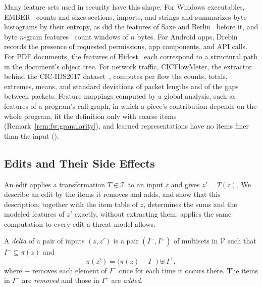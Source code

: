 Many feature sets used in security have this shape. For Windows executables, EMBER~\cite{anderson2018ember} counts
and sizes sections, imports, and strings and summarizes byte histograms by their entropy, as did the features of Saxe
and Berlin~\cite{saxe2015deep} before it, and byte $n$-gram features~\cite{kolter2004learning} count windows of $n$
bytes. For Android apps, Drebin~\cite{arp2014drebin} records the presence of requested permissions, app components,
and API calls. For PDF documents, the features of Hidost~\cite{srndic2016hidost} each correspond to a structural
path in the document's object tree. %
For network traffic, CICFlowMeter, the extractor behind the CIC-IDS2017
dataset~\cite{sharafaldin2018toward}, computes per flow the counts, totals, extremes, means, and standard deviations
of packet lengths and of the gaps between packets. Feature mappings computed by a global analysis, such as features of
a program's call graph, in which a piece's contribution depends on the whole program, fit the definition only with
coarse items (Remark~\ref{rem:fw:granularity}), and learned representations have no items finer than the input
().

\subsection{Edits and Their Side Effects}
\label{sec:fw:side-effects}

An edit applies a transformation $T \in \mathcal{T}$ to an input $z$ and gives $z' = T(z)$. We describe an edit by the
items it removes and adds, and show that this description, together with the item table of $z$, determines the sums
and the modeled features of $z'$ exactly, without extracting them.  applies the same computation to every edit a threat model
allows.

\label{def:fw:delta}
{
A \emph{delta} of a pair of inputs $(z, z')$ is a pair $(I^-, I^+)$ of multisets in $\mathcal{V}$ such that
$I^- \subseteq \pi(z)$ and
\begin{equation}
  \label{eq:fw:delta}
  \pi(z') = \big(\pi(z) - I^-\big) \uplus I^+,
\end{equation}
where $-$ removes each element of $I^-$ once for each time it occurs there. The items in $I^-$ are \emph{removed} and
those in $I^+$ are \emph{added}.
}

